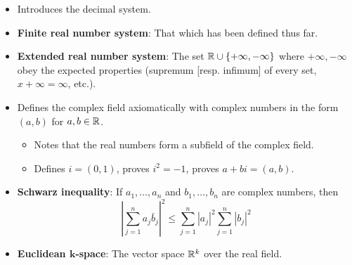 \documentclass[../../notes.tex]{subfiles}
\begin{document}
\begin{itemize}
    \item Introduces the decimal system.
    \item \textbf{Finite real number system}: That which has been defined thus far.
    \item \textbf{Extended real number system}: The set $\mathbb{R}\cup\{+\infty,-\infty\}$ where $+\infty,-\infty$ obey the expected properties (supremum [resp. infimum] of every set, $x+\infty=\infty$, etc.).
    \item Defines the complex field axiomatically with complex numbers in the form $(a,b)$ for $a,b\in\mathbb{R}$.
    \begin{itemize}
        \item Notes that the real numbers form a subfield of the complex field.
        \item Defines $i=(0,1)$, proves $i^2=-1$, proves $a+bi=(a,b)$.
    \end{itemize}
    \item \textbf{Schwarz inequality}: If $a_1,\dots,a_n$ and $b_1,\dots,b_n$ are complex numbers, then
    \begin{equation*}
        \left| \sum_{j=1}^na_j\bar{b}_j \right|^2 \leq \sum_{j=1}^n|a_j|^2\sum_{j=1}^n|b_j|^2
    \end{equation*}
    \item \textbf{Euclidean $\bm{k}$-space}: The vector space $\mathbb{R}^k$ over the real field.
\end{itemize}
\end{document}
